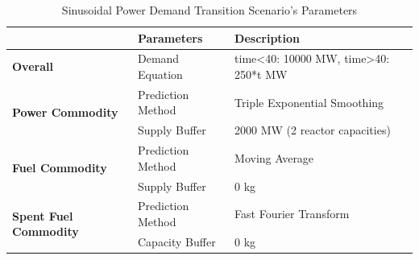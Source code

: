 \documentclass{anstrans}
\begin{document}
\begin{table}[!htbp]
    \centering
    \caption {Sinusoidal Power Demand Transition Scenario's Parameters}
	\label{tab:transition-scenario-sine-power}
    \begin{tabular}{|l|l|p{4.5cm}|}
    \hline
                                     & \textbf{Parameters}    & \textbf{Description} \\ \hline
    \textbf{Overall}& Demand Equation & time<40: 10000 MW, time>40: 250*t MW \\ \hline
    \multirow{2}{*}{\textbf{Power Commodity}} & Prediction Method      &  Triple Exponential Smoothing \\ \cline{2-3} 
                                     & Supply Buffer          &  2000 MW (2 reactor capacities)\\ \hline
    \multirow{2}{*}{\textbf{Fuel Commodity}}  & Prediction Method      &  Moving Average\\ \cline{2-3}
                                     & Supply Buffer & 0 kg \\ \hline
    \multirow{2}{*}{\textbf{Spent Fuel Commodity}}  & Prediction Method      & Fast Fourier Transform\\ \cline{2-3}
                                     & Capacity Buffer & 0 kg \\ \hline
    \end{tabular}
\end{table}
\end{document}
